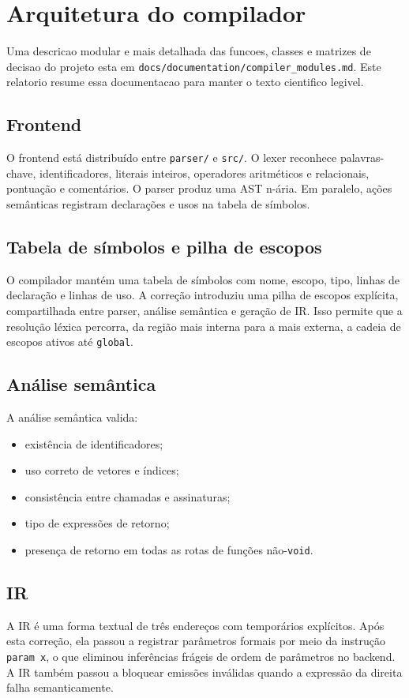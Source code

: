 \documentclass[12pt,a4paper]{article}
\begin{document}
\section{Arquitetura do compilador}
Uma descricao modular e mais detalhada das funcoes, classes e matrizes de decisao do projeto esta em \texttt{docs/documentation/compiler\_modules.md}. Este relatorio resume essa documentacao para manter o texto cientifico legivel.

\subsection{Frontend}
O frontend está distribuído entre \texttt{parser/} e \texttt{src/}. O lexer reconhece palavras-chave, identificadores, literais inteiros, operadores aritméticos e relacionais, pontuação e comentários. O parser produz uma AST n-ária. Em paralelo, ações semânticas registram declarações e usos na tabela de símbolos.

\subsection{Tabela de símbolos e pilha de escopos}
O compilador mantém uma tabela de símbolos com nome, escopo, tipo, linhas de declaração e linhas de uso. A correção introduziu uma pilha de escopos explícita, compartilhada entre parser, análise semântica e geração de IR. Isso permite que a resolução léxica percorra, da região mais interna para a mais externa, a cadeia de escopos ativos até \texttt{global}.

\subsection{Análise semântica}
A análise semântica valida:
\begin{itemize}[leftmargin=1.5em]
    \item existência de identificadores;
    \item uso correto de vetores e índices;
    \item consistência entre chamadas e assinaturas;
    \item tipo de expressões de retorno;
    \item presença de retorno em todas as rotas de funções não-\texttt{void}.
\end{itemize}

\subsection{IR}
A IR é uma forma textual de três endereços com temporários explícitos. Após esta correção, ela passou a registrar parâmetros formais por meio da instrução \texttt{param x}, o que eliminou inferências frágeis de ordem de parâmetros no backend. A IR também passou a bloquear emissões inválidas quando a expressão da direita falha semanticamente.
\end{document}
